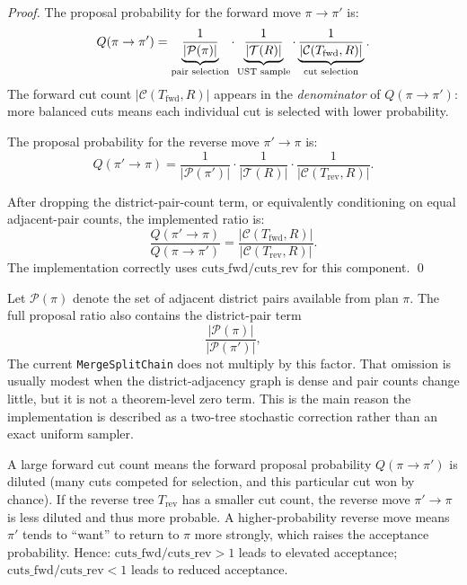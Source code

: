 \begin{proof}
The proposal probability for the forward move $\pi \to \pi'$ is:
\[
  Q(\pi \to \pi')
  = \underbrace{\frac{1}{|\mathcal{P}(\pi)|}}_{%
      \text{pair selection}}
  \cdot \underbrace{\frac{1}{|\mathcal{T}(R)|}}_{%
      \text{UST sample}}
  \cdot \underbrace{\frac{1}{|\mathcal{C}(T_{\mathrm{fwd}}, R)|}}_{%
      \text{cut selection}}.
\]
The forward cut count $|\mathcal{C}(T_{\mathrm{fwd}}, R)|$ appears in the
\emph{denominator} of $Q(\pi \to \pi')$: more balanced cuts means each
individual cut is selected with lower probability.

The proposal probability for the reverse move $\pi' \to \pi$ is:
\[
  Q(\pi' \to \pi)
  = \frac{1}{|\mathcal{P}(\pi')|}
  \cdot \frac{1}{|\mathcal{T}(R)|}
  \cdot \frac{1}{|\mathcal{C}(T_{\mathrm{rev}}, R)|}.
\]

After dropping the district-pair-count term, or equivalently conditioning on
equal adjacent-pair counts, the implemented ratio is:
\[
  \frac{Q(\pi' \to \pi)}{Q(\pi \to \pi')}
  = \frac{|\mathcal{C}(T_{\mathrm{fwd}}, R)|}{|\mathcal{C}(T_{\mathrm{rev}}, R)|}.
\]
The implementation correctly uses
$\mathrm{cuts\_fwd} / \mathrm{cuts\_rev}$ for this component. \qed
\end{proof}

\begin{remark}
\normalfont
Let $\mathcal{P}(\pi)$ denote the set of adjacent district pairs available from
plan $\pi$. The full proposal ratio also contains the district-pair term
\[
  \frac{|\mathcal{P}(\pi)|}{|\mathcal{P}(\pi')|},
\]
The current \texttt{MergeSplitChain} does not multiply by this factor.
That omission is usually modest when the district-adjacency graph is dense and
pair counts change little, but it is not a theorem-level zero term.
This is the main reason the implementation is described as a two-tree
stochastic correction rather than an exact uniform sampler.
\end{remark}

\begin{remark}
A large forward cut count means the forward proposal probability
$Q(\pi \to \pi')$ is diluted (many cuts competed for selection, and this
particular cut won by chance).
If the reverse tree $T_{\mathrm{rev}}$ has a smaller cut count, the reverse
move $\pi' \to \pi$ is less diluted and thus more probable.
A higher-probability reverse move means $\pi'$ tends to ``want'' to return
to $\pi$ more strongly, which raises the acceptance probability.
Hence: $\mathrm{cuts\_fwd} / \mathrm{cuts\_rev} > 1$ leads to elevated
acceptance; $\mathrm{cuts\_fwd} / \mathrm{cuts\_rev} < 1$ leads to reduced
acceptance.
\end{remark}

